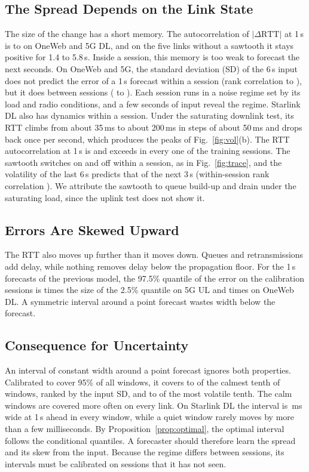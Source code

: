 \subsection{The Spread Depends on the Link State}
The size of the change has a short memory. The autocorrelation of $|\Delta\mathrm{RTT}|$ at 1\,s is \VolAbsdLo{} to \VolAbsdHi{} on OneWeb and 5G DL, and on the five links without a sawtooth it stays positive for 1.4 to 5.8\,s. Inside a session, this memory is too weak to forecast the next seconds. On OneWeb and 5G, the standard deviation (SD) of the 6\,s input does not predict the error of a 1\,s forecast within a session (rank correlation \VolWithinLo{} to \VolWithinHi), but it does between sessions (\VolBetweenLo{} to \VolBetweenHi). Each session runs in a noise regime set by its load and radio conditions, and a few seconds of input reveal the regime. Starlink DL also has dynamics within a session. Under the saturating downlink test, its RTT climbs from about 35\,ms to about 200\,ms in steps of about 50\,ms and drops back once per second, which produces the peaks of Fig.~\ref{fig:vol}(b). The RTT autocorrelation at 1\,s is \VolSLDLlevel{} and exceeds \VolSLDLlevelMin{} in every one of the \VolSLDLnSess{} training sessions. The sawtooth switches on and off within a session, as in Fig.~\ref{fig:trace}, and the volatility of the last 6\,s predicts that of the next 3\,s (within-session rank correlation \VolSLDLrv). We attribute the sawtooth to queue build-up and drain under the saturating load, since the uplink test does not show it.

\subsection{Errors Are Skewed Upward}
The RTT also moves up further than it moves down. Queues and retransmissions add delay, while nothing removes delay below the propagation floor. For the 1\,s forecasts of the previous model, the 97.5\% quantile of the error on the calibration sessions is \SkewQUL{} times the size of the 2.5\% quantile on 5G UL and \SkewOWDL{} times on OneWeb DL. A symmetric interval around a point forecast wastes width below the forecast.

\subsection{Consequence for Uncertainty}
An interval of constant width around a point forecast ignores both properties. Calibrated to cover 95\% of all windows, it covers \CovConstCalmLo{} to \CovConstCalmHi{} of the calmest tenth of windows, ranked by the input SD, and \CovConstVolLo{} to \CovConstVolHi{} of the most volatile tenth. The calm windows are covered more often on every link. On Starlink DL the interval is \WidConstSLDL\,ms wide at 1\,s ahead in every window, while a quiet window rarely moves by more than a few milliseconds. By Proposition~\ref{prop:optimal}, the optimal interval follows the conditional quantiles. A forecaster should therefore learn the spread and its skew from the input. Because the regime differs between sessions, its intervals must be calibrated on sessions that it has not seen.
